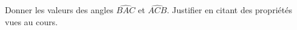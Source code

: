 
\begin{exercice}\label{exo2smath-0222}

    Donner les valeurs des angles \( \widehat{BAC}\) et \( \widehat{ACB}\). Justifier en citant des propriétés vues au cours.

\begin{center}

\end{center}

\end{exercice}
